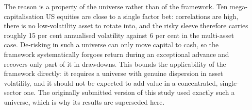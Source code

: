 The reason is a property of the universe rather than of the framework. Ten
mega-capitalisation US equities are close to a single factor bet: correlations are high,
there is no low-volatility asset to rotate into, and the risky sleeve therefore carries
roughly 15 per cent annualised volatility against 6 per cent in the multi-asset case.
De-risking in such a universe can only move capital to cash, so the framework
systematically forgoes return during an exceptional advance and recovers only part of it
in drawdowns. This bounds the applicability of the framework directly: it requires a
universe with genuine dispersion in asset volatility, and it should not be expected to
add value in a concentrated, single-sector one. The originally submitted version of this
study used exactly such a universe, which is why its results are superseded here.
